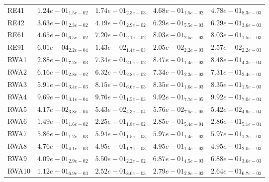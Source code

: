 \documentclass{article}
\begin{document}
\begin{table}
\begin{scriptsize}
\begin{tabular}{lllll}
RE41 & $  1.24e-01_{ 1.5e-02}$ & $  1.74e-01_{ 2.3e-03}$ & \cellcolor{gray25}$  4.68e-01_{ 1.5e-02}$ & \cellcolor{gray95}$  4.78e-01_{ 8.3e-03}$ \\
RE42 & $  3.63e-01_{ 2.3e-02}$ & $  4.19e-01_{ 2.9e-02}$ & \cellcolor{gray95}$  6.29e-01_{ 5.5e-03}$ & \cellcolor{gray25}$  6.29e-01_{ 3.6e-03}$ \\
RE61 & $  4.65e-01_{ 6.5e-02}$ & $  7.20e-01_{ 2.1e-02}$ & \cellcolor{gray95}$  8.03e-01_{ 2.5e-03}$ & \cellcolor{gray25}$  8.03e-01_{ 1.5e-03}$ \\
RE91 & $  6.01e-04_{ 2.2e-04}$ & $  1.43e-02_{ 1.4e-03}$ & \cellcolor{gray25}$  2.05e-02_{ 2.2e-03}$ & \cellcolor{gray95}$  2.57e-02_{ 2.2e-03}$ \\
RWA1 & $  2.88e-01_{ 7.2e-03}$ & $  7.34e-01_{ 2.0e-02}$ & \cellcolor{gray25}$  8.47e-01_{ 1.4e-03}$ & \cellcolor{gray95}$  8.48e-01_{ 4.3e-04}$ \\
RWA2 & $  6.16e-01_{ 2.8e-02}$ & $  6.32e-01_{ 2.8e-02}$ & \cellcolor{gray95}$  7.34e-01_{ 2.3e-03}$ & \cellcolor{gray25}$  7.31e-01_{ 2.4e-03}$ \\
RWA3 & $  5.91e-01_{ 3.4e-03}$ & $  8.15e-01_{ 6.6e-03}$ & \cellcolor{gray95}$  8.35e-01_{ 1.6e-03}$ & \cellcolor{gray25}$  8.35e-01_{ 1.5e-03}$ \\
RWA4 & $  9.69e-01_{ 3.1e-04}$ & $  9.76e-01_{ 1.5e-03}$ & \cellcolor{gray95}$  9.92e-01_{ 7.7e-05}$ & \cellcolor{gray25}$  9.92e-01_{ 7.0e-04}$ \\
RWA5 & $  4.17e-02_{ 3.8e-04}$ & \cellcolor{gray25}$  5.43e-02_{ 4.3e-04}$ & \cellcolor{gray95}$  5.76e-02_{ 7.5e-05}$ & $  5.42e-02_{ 4.9e-04}$ \\
RWA6 & $  1.49e-01_{ 1.6e-02}$ & $  2.25e-01_{ 1.8e-02}$ & \cellcolor{gray25}$  2.85e-01_{ 5.4e-04}$ & \cellcolor{gray95}$  2.86e-01_{ 5.1e-04}$ \\
RWA7 & $  5.86e-01_{ 1.2e-03}$ & $  5.94e-01_{ 1.5e-03}$ & \cellcolor{gray25}$  5.97e-01_{ 1.4e-03}$ & \cellcolor{gray95}$  5.97e-01_{ 1.2e-03}$ \\
RWA8 & $  4.76e-01_{ 4.1e-03}$ & \cellcolor{gray95}$  4.95e-01_{ 1.7e-03}$ & \cellcolor{gray25}$  4.95e-01_{ 1.4e-03}$ & $  4.95e-01_{ 2.0e-03}$ \\
RWA9 & $  4.09e-01_{ 2.9e-02}$ & $  5.50e-01_{ 2.2e-02}$ & \cellcolor{gray25}$  6.87e-01_{ 4.5e-03}$ & \cellcolor{gray95}$  6.88e-01_{ 3.6e-03}$ \\
RWA10 & $  1.12e-01_{ 6.9e-03}$ & $  2.52e-01_{ 8.6e-03}$ & \cellcolor{gray95}$  2.79e-01_{ 2.8e-03}$ & \cellcolor{gray25}$  2.64e-01_{ 6.7e-03}$ \\
\hline
\end{tabular}
\end{scriptsize}
\end{table}
\end{document}
